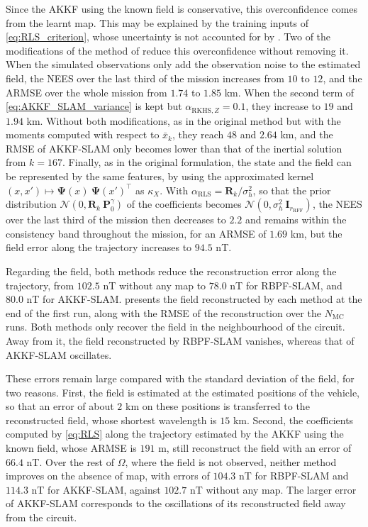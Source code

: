 Since the AKKF using the known field is conservative, this overconfidence comes from the learnt map. This may be explained by the training inputs of \eqref{eq:RLS_criterion}, whose uncertainty is not accounted for by . Two of the modifications of the method of \cite{bib:RFF-KKF-SLAM} reduce this overconfidence without removing it. When the simulated observations only add the observation noise to the estimated field, the NEES over the last third of the mission increases from $10$ to $12$, and the ARMSE over the whole mission from $1.74$ to $1.85$ km. When the second term of \eqref{eq:AKKF_SLAM_variance} is kept but $\alpha_{\mathrm{RKHS},Z}=0.1$, they increase to $19$ and $1.94$ km. Without both modifications, as in the original method but with the moments computed with respect to $\bar{x}_k$, they reach $48$ and $2.64$ km, and the RMSE of AKKF-SLAM only becomes lower than that of the inertial solution from $k=167$. Finally, as in the original formulation, the state and the field can be represented by the same features, by using the approximated kernel $(x,x')\mapsto\boldsymbol{\Psi}(x)\:\boldsymbol{\Psi}(x')^\top$ as $\kappa_X$. With $\alpha_{\mathrm{RLS}}=\mathbf{R}_k/\sigma_h^2$, so that the prior distribution $\mathcal{N}\left(0,\mathbf{R}_k\:\mathbf{P}_0^\gamma\right)$ of the coefficients becomes $\mathcal{N}\left(0,\sigma_h^2\:\mathbf{I}_{r_{\mathrm{RFF}}}\right)$, the NEES over the last third of the mission then decreases to $2.2$ and remains within the consistency band throughout the mission, for an ARMSE of $1.69$ km, but the field error along the trajectory increases to $94.5$ nT.

Regarding the field, both methods reduce the reconstruction error along the trajectory, from $102.5$ nT without any map to $78.0$ nT for RBPF-SLAM, and $80.0$ nT for AKKF-SLAM.  presents the field reconstructed by each method at the end of the first run, along with the RMSE of the reconstruction over the $N_\mathrm{MC}$ runs. Both methods only recover the field in the neighbourhood of the circuit. Away from it, the field reconstructed by RBPF-SLAM vanishes, whereas that of AKKF-SLAM oscillates.

These errors remain large compared with the standard deviation of the field, for two reasons. First, the field is estimated at the estimated positions of the vehicle, so that an error of about $2$ km on these positions is transferred to the reconstructed field, whose shortest wavelength is $15$ km. Second, the coefficients computed by \eqref{eq:RLS} along the trajectory estimated by the AKKF using the known field, whose ARMSE is $191$ m, still reconstruct the field with an error of $66.4$ nT. Over the rest of $\Omega$, where the field is not observed, neither method improves on the absence of map, with errors of $104.3$ nT for RBPF-SLAM and $114.3$ nT for AKKF-SLAM, against $102.7$ nT without any map. The larger error of AKKF-SLAM corresponds to the oscillations of its reconstructed field away from the circuit.


